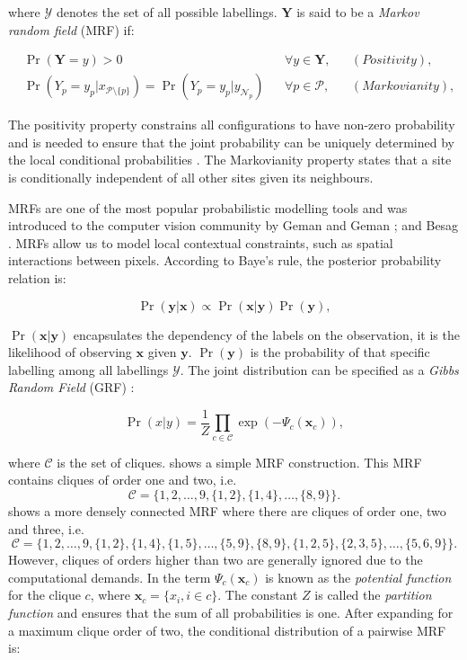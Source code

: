 where $\mathcal{Y}$ denotes the set of all possible labellings. $\mathbf{Y}$ is said to be a \textit{Markov random field} (MRF) if:

\begin{align}
	&\Pr(\mathbf{Y}=y) > 0&  &\forall y \in \mathbf{Y},& &(Positivity),&
	\label{eq:markovpositivity}	\\
	&\Pr(Y_p=y_p | x_{\mathcal{P}\setminus \{p\}}) = \Pr(Y_p=y_p | y_{\mathcal{N}_p})&  &\forall p \in \mathcal{P},& &(Markovianity),&
	\label{eq:markovmarkovianity}
\end{align}

The positivity property constrains all configurations to have non-zero probability and is needed to ensure that the joint probability can be uniquely determined by the local conditional probabilities \citep{Smith1997}.
The Markovianity property states that a site is conditionally independent of all other sites given its neighbours.

MRFs are one of the most popular probabilistic modelling tools and was introduced to the computer vision community by Geman and Geman \citep{Geman1984}; and Besag \citep{Besag1986}.
MRFs allow us to model local contextual constraints, such as spatial interactions between pixels.
According to Baye's rule, the posterior probability relation is:

\begin{equation}
	\Pr(\mathbf{y}|\mathbf{x}) \propto \Pr(\mathbf{x}|\mathbf{y})\Pr(\mathbf{y}),
\end{equation}

$\Pr(\mathbf{x}|\mathbf{y})$ encapsulates the dependency of the labels on the observation, it is the likelihood of observing $\mathbf{x}$ given $\mathbf{y}$.
$\Pr(\mathbf{y})$ is the probability of that specific labelling among all labellings $\mathcal{Y}$.
The joint distribution can be specified as a \textit{Gibbs Random Field} (GRF) \citep{Lafferty2001,HammersleyClifford1971}:

\begin{equation}
	\Pr(x|y) = \frac{1}{Z}\prod_{c \in \mathcal{C}}\exp(-\Psi_c(\mathbf{x}_c)),
	\label{eq:gibbs1}
\end{equation}

where $\mathcal{C}$ is the set of cliques.
 shows a simple MRF construction.
This MRF contains cliques of order one and two, i.e. $$\mathcal{C} = \{1, 2, \ldots, 9, \{1,2\}, \{1,4\}, \ldots, \{8,9\}\}.$$  shows a more densely connected MRF where there are cliques of order one, two and three, i.e. $$\mathcal{C} = \{1, 2, \ldots, 9, \{1,2\}, \{1,4\}, \{1,5\}, \ldots, \{5,9\}, \{8,9\}, \{1,2,5\}, \{2,3,5\}, \ldots, \{5,6,9\} \}.$$
However, cliques of orders higher than two are generally ignored due to the computational demands.
In  the term $\Psi_c(\mathbf{x}_c)$ is known as the \textit{potential function} for the clique $c$, where $\mathbf{x}_c = \{x_i, i \in c\}$.
The constant $Z$ is called the \textit{partition function} and ensures that the sum of all probabilities is one.
After expanding  for a maximum clique order of two, the conditional distribution of a pairwise MRF is:

